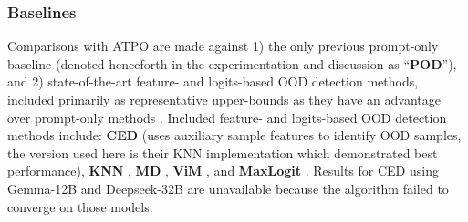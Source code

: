 \subsubsection{Baselines}
Comparisons with ATPO are made against 1) the only previous prompt-only baseline \cite{wang2024beyond} (denoted henceforth in the experimentation and discussion as ``\textbf{POD}''), and 2) state-of-the-art feature- and logits-based OOD detection methods, included primarily as representative upper-bounds as they have an advantage over prompt-only methods \cite{baran2023classical,zhang2023openood}. Included feature- and logits-based OOD detection methods include: \textbf{CED} \cite{lee2024ced} (uses auxiliary sample features to identify OOD samples, the version used here is their KNN implementation which demonstrated best performance), \textbf{KNN} \cite{sun2022out,uppaal2023fine}, \textbf{MD} \cite{lee2018simple,ren2021simple,uppaal2023fine}, \textbf{ViM} \cite{wang2022vim}, and \textbf{MaxLogit} \cite{hendrycks2019scaling}. Results for CED using Gemma-12B and Deepseek-32B are unavailable because the algorithm failed to converge on those models.

